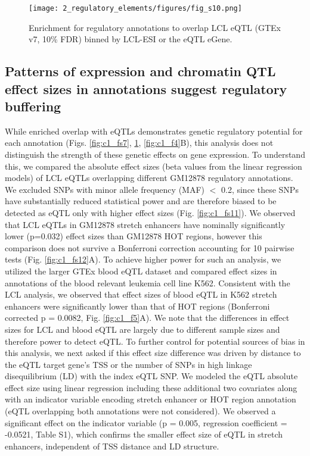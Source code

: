 \begin{figure}
    \centering
    \texttt{[image: 2\_regulatory\_elements/figures/fig\_s10.png]}
    \caption{Enrichment for regulatory annotations to overlap LCL eQTL (GTEx v7, 10\% FDR) binned by LCL-ESI or the eQTL eGene.}
    \label{fig:c1_fs10}
\end{figure}

\subsection{Patterns of expression and chromatin QTL effect sizes in annotations suggest regulatory buffering}
While enriched overlap with eQTLs demonstrates genetic regulatory potential for each annotation (Figs. \ref{fig:c1_fs7}, \ref{fig:c1_fs10}, \ref{fig:c1_f4}B), this analysis does not distinguish the strength of these genetic effects on gene expression. To understand this, we compared the absolute effect sizes (beta values from the linear regression models) of LCL eQTLs overlapping different GM12878 regulatory annotations. We excluded SNPs with minor allele frequency (MAF) $<$ 0.2, since these SNPs have substantially reduced statistical power and are therefore biased to be detected as eQTL only with higher effect sizes (Fig. \ref{fig:c1_fs11}). We observed that LCL eQTLs in GM12878 stretch enhancers have nominally significantly lower (p=0.032) effect sizes than GM12878 HOT regions, however this comparison does not survive a Bonferroni correction accounting for 10 pairwise tests (Fig. \ref{fig:c1_fs12}A). To achieve higher power for such an analysis, we utilized the larger GTEx blood eQTL dataset and compared effect sizes in annotations of the blood relevant leukemia cell line K562. Consistent with the LCL analysis, we observed that effect sizes of blood eQTL in K562 stretch enhancers were significantly lower than that of HOT regions (Bonferroni corrected p = 0.0082, Fig. \ref{fig:c1_f5}A). We note that the differences in effect sizes for LCL and blood eQTL are largely due to different sample sizes and therefore power to detect eQTL. To further control for potential sources of bias in this analysis, we next asked if this effect size difference was driven by distance to the eQTL target gene’s TSS or the number of SNPs in high linkage disequilibrium (LD) with the index eQTL SNP. We modeled the eQTL absolute effect size using linear regression including these additional two covariates along with an indicator variable encoding stretch enhancer or HOT region annotation (eQTL overlapping both annotations were not considered). We observed a significant effect on the indicator variable (p = 0.005, regression coefficient = -0.0521, Table S1), which confirms the smaller effect size of eQTL in stretch enhancers, independent of TSS distance and LD structure. \\

